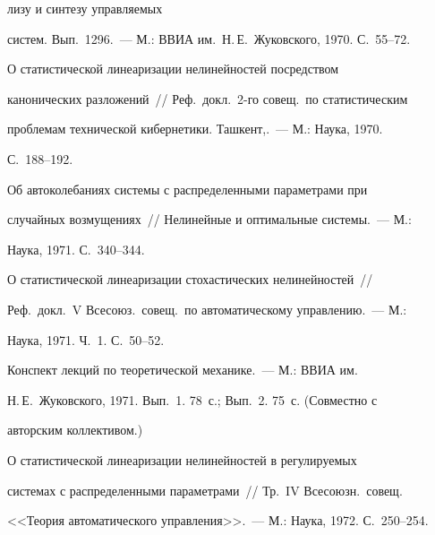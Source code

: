 \noindent


лизу и синтезу управляемых


систем. Вып.~1296.~--- М.: ВВИА им.\ Н.\,Е.~Жуковского, 1970. С.~55--72.





 О статистической линеаризации нелинейностей посредством


канонических разложений~// Реф.\ докл.\ 2-го совещ.\ по статистическим


проблемам технической кибернетики. Ташкент,.~--- М.: Наука, 1970.


С.~188--192.










 Об автоколебаниях системы с распределенными па\-ра\-мет\-ра\-ми при


случайных возмущениях~// Нелинейные и оптимальные системы.~--- М.:


Наука, 1971. С.~340--344.





 О статистической линеаризации стохастических нелинейностей~//


Реф.\ докл.\ V Всесоюз.\ совещ.\ по автоматическому управ\-ле\-нию.~--- М.:


Наука, 1971. Ч.~1. С.~50--52.





 Конспект лекций по теоретической механике.~--- М.: ВВИА им.\


Н.\,Е.~Жуковского, 1971. Вып.~1. 78~с.; Вып.~2. 75~с. (Совместно с


авторским коллективом.)










 О статистической линеаризации нелинейностей в регули\-ру\-емых


системах с распределенными параметрами~// Тр.\ IV Всесоюзн.\ совещ.\


<<Теория автоматического управления>>.~--- М.: Наука, 1972. С.~250--254.






